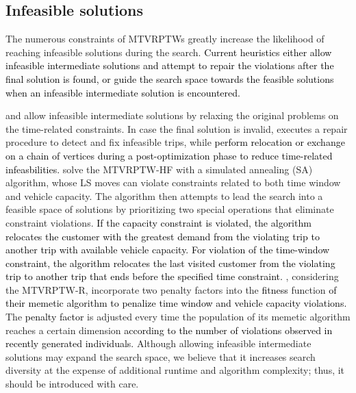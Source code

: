 \documentclass[11pt]{article}
\newcommand\add[1]{\textcolor{black}{#1}}
\begin{document}
\subsection{Infeasible solutions}
The numerous constraints of MTVRPTWs greatly increase the likelihood of reaching infeasible solutions during the search.  \add{Current heuristics either allow infeasible intermediate solutions and attempt to repair the violations after the final solution is found, or guide the search space towards the feasible solutions when an infeasible intermediate solution is encountered.} \newline

\cite{cattaruzza2014iterated} and \cite{franccois2019adaptive} allow infeasible intermediate solutions by relaxing the original problems on the time-related constraints.  In case the final solution is invalid, \cite{cattaruzza2014iterated} executes a repair procedure to detect and fix infeasible trips, while \cite{franccois2019adaptive} %
\add{perform relocation or exchange on a chain of vertices during a post-optimization phase to reduce time-related infeasbilities.}  \cite{despaux2016multi} solve the MTVRPTW-HF with a simulated annealing (SA) algorithm, whose LS moves can violate constraints related to both time window and vehicle capacity.  The algorithm then attempts to lead the search into a feasible space of solutions by prioritizing two special operations that eliminate constraint violations.  \add{If the capacity constraint is violated, the algorithm relocates the customer with the greatest demand from the violating trip to another trip with available vehicle capacity.  For violation of the time-window constraint, the algorithm relocates the last visited customer from the violating trip to another trip that ends before the specified time constraint.}    \cite{cattaruzza2016multi}, considering the MTVRPTW-R, incorporate two penalty factors into the \add{fitness} function \add{of their memetic algorithm to penalize time window and vehicle capacity violations.}  The \add{penalty factor} is adjusted every time the population of its memetic algorithm reaches a certain dimension 
\add{according to the number of violations observed in recently generated individuals.}  Although allowing infeasible intermediate solutions may expand the search space, we believe that it increases search diversity at the expense of additional runtime and algorithm complexity; thus, it should be introduced with care.
\end{document}
